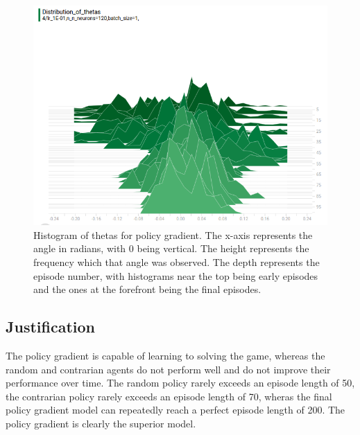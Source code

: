 \documentclass[12pt,a4paper]{article}
\begin{document}
\begin{figure}[htbp]
\begin{center}
\includegraphics[width=\linewidth]{pg_thetas.png}
\caption{Histogram of thetas for policy gradient. The x-axis represents the angle in radians, with 0 being vertical. The height represents the frequency which that angle was observed. The depth represents the episode number, with histograms near the top being early episodes and the ones at the forefront being the final episodes.}
\label{pg_thetas}
\end{center}
\end{figure}

\subsection*{Justification}
The policy gradient is capable of learning to solving the game, whereas the random and contrarian agents do not perform well and do not improve their performance over time. The random policy rarely exceeds an episode length of 50, the contrarian policy rarely exceeds an episode length of 70, wheras the final policy gradient model can repeatedly reach a perfect episode length of 200. The policy gradient is clearly the superior model.
\end{document}

